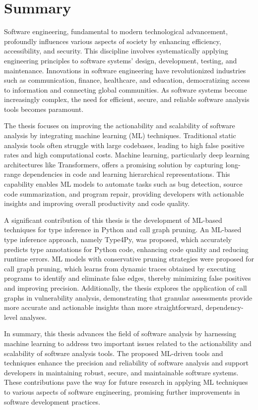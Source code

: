 \chapter*{Summary}

Software engineering, fundamental to modern technological advancement, profoundly influences various aspects of society by enhancing efficiency, accessibility, and security. This discipline involves systematically applying engineering principles to software systems' design, development, testing, and maintenance. Innovations in software engineering have revolutionized industries such as communication, finance, healthcare, and education, democratizing access to information and connecting global communities. As software systems become increasingly complex, the need for efficient, secure, and reliable software analysis tools becomes paramount.

The thesis focuses on improving the actionability and scalability of software analysis by integrating machine learning (ML) techniques. Traditional static analysis tools often struggle with large codebases, leading to high false positive rates and high computational costs. Machine learning, particularly deep learning architectures like Transformers, offers a promising solution by capturing long-range dependencies in code and learning hierarchical representations. This capability enables ML models to automate tasks such as bug detection, source code summarization, and program repair, providing developers with actionable insights and improving overall productivity and code quality.

A significant contribution of this thesis is the development of ML-based techniques for type inference in Python and call graph pruning. An ML-based type inference approach, namely Type4Py, was proposed, which accurately predicts type annotations for Python code, enhancing code quality and reducing runtime errors. ML models with conservative pruning strategies were proposed for call graph pruning, which learns from dynamic traces obtained by executing programs to identify and eliminate false edges, thereby minimizing false positives and improving precision. Additionally, the thesis explores the application of call graphs in vulnerability analysis, demonstrating that granular assessments provide more accurate and actionable insights than more straightforward, dependency-level analyses.

In summary, this thesis advances the field of software analysis by harnessing machine learning to address two important issues related to the actionability and scalability of software analysis tools. The proposed ML-driven tools and techniques enhance the precision and reliability of software analysis and support developers in maintaining robust, secure, and maintainable software systems. These contributions pave the way for future research in applying ML techniques to various aspects of software engineering, promising further improvements in software development practices.



